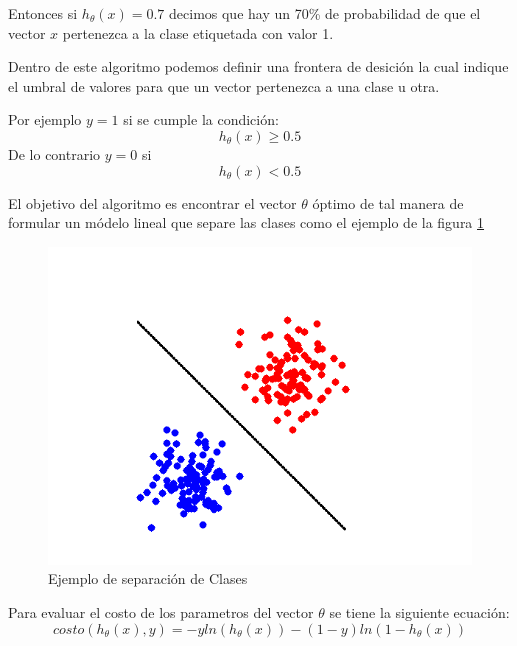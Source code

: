 Entonces si $h_{\theta}(x) = 0.7$ decimos que hay un 70\% de probabilidad de que el vector $x$ pertenezca a la clase etiquetada con valor 1.

Dentro de este algoritmo podemos definir una frontera de desici\'on la cual indique el umbral de valores para que un vector pertenezca a una clase u otra.

Por ejemplo $y = 1$ si se cumple la condici\'on: 
\begin{equation}
h_{\theta}(x) \geq 0.5
\end{equation}
De lo contrario $y = 0$ si
\begin{equation}
h_{\theta}(x) < 0.5
\end{equation}

El objetivo del algoritmo es encontrar el vector $\theta$ \'optimo de tal manera de formular un m\'odelo lineal que separe las clases como el ejemplo de la figura \ref{fig:ejemploClases}

\begin{figure}[h!]
	\begin{center}
	\includegraphics[scale=.3]{images/clasesejemplo}
	\caption{Ejemplo de separaci\'on de Clases}
	\label{fig:ejemploClases}
	\end{center}
\end{figure}

Para evaluar el costo de los parametros del vector $\theta$ se tiene la siguiente ecuaci\'on:
\begin{equation}
costo(h_{\theta}(x),y) = -yln(h_{\theta}(x))-(1-y)ln(1-h_{\theta}(x))
\end{equation}


